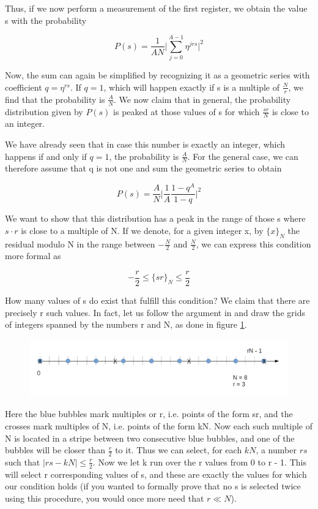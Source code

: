\documentclass[a4paper, draft]{article}
\theoremstyle{own}
\theoremstyle{remark}
\begin{document}
Thus, if we now perform a measurement of the first register, we obtain the value s with the probability

$$
P(s) = \frac{1}{AN} \big| \sum_{j=0}^{A-1}  \eta^{jrs} \big|^2
$$

Now, the sum can again be simplified by recognizing it as a geometric series with coefficient $q = \eta^{rs}$. If $q = 1$, which will happen exactly if s is a multiple of $\frac{N}{r}$, we find that the probability is $\frac{A}{N}$. We now claim that in general, the probability distribution given by $P(s)$ is peaked at those values of s for which $\frac{sr}{N}$ is close to an integer.

We have already seen that in case this number is exactly an integer, which happens if and only if $q = 1$, the probability is $\frac{A}{N}$. For the general case, we can therefore assume that q is not one and sum the geometric series to obtain

$$
P(s) = \frac{A}{N} \big| \frac{1}{A} \frac{1 - q^A}{1 - q} \big|^2
$$

We want to show that this distribution has a peak in the range of those s where $s\cdot r$ is close to a multiple of N. If we denote, for a given integer x, by $\{x\}_N$ the residual modulo N in the range between $-\frac{N}{2}$ and $\frac{N}{2}$, we can express this condition more formal as

$$
-\frac{r}{2} \leq \{sr \}_N \leq \frac{r}{2}
$$
 
 
How many values of s do exist that fulfill this condition?  We claim that there are precisely r such values. In fact, let us follow the argument in \cite{P} and draw the grids of integers spanned by the numbers r and N, as done in figure \ref{fig:ShorGrids}.

\begin{figure}[ht]
\centering
\includegraphics[width=1.0\linewidth]{images/ShorGrids}
\caption[The grid spanned by N and r]{}
\label{fig:ShorGrids}
\end{figure}

Here the blue bubbles mark multiples or r, i.e. points of the form sr, and the crosses mark multiples of N, i.e. points of the form kN. Now each such multiple of N is located in a stripe between two consecutive blue bubbles, and one of the bubbles will be closer than $\frac{r}{2}$ to it. Thus we can select, for each $kN$, a number $rs$ such that $|rs - kN| \leq \frac{r}{2}$. Now we let k run over the r values from 0 to r - 1. This will select r corresponding values of s, and these are exactly the values for which our condition holds (if you wanted to formally prove that no s is selected twice using this procedure, you would once more need that $r \ll N$).
 
\end{document}
